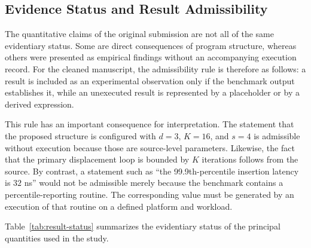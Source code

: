 \documentclass[conference]{IEEEtran}
\begin{document}
\subsection{Evidence Status and Result Admissibility}
\label{subsec:result_admissibility}

The quantitative claims of the original submission are not all of the same evidentiary status. Some are direct consequences of program structure, whereas others were presented as empirical findings without an accompanying execution record. For the cleaned manuscript, the admissibility rule is therefore as follows: a result is included as an experimental observation only if the benchmark output establishes it, while an unexecuted result is represented by a placeholder or by a derived expression.

This rule has an important consequence for interpretation. The statement that the proposed structure is configured with $d=3$, $K=16$, and $s=4$ is admissible without execution because those are source-level parameters. Likewise, the fact that the primary displacement loop is bounded by $K$ iterations follows from the source. By contrast, a statement such as ``the 99.9th-percentile insertion latency is $32$ ns'' would not be admissible merely because the benchmark contains a percentile-reporting routine. The corresponding value must be generated by an execution of that routine on a defined platform and workload.

Table~\ref{tab:result-status} summarizes the evidentiary status of the principal quantities used in the study.
\end{document}
